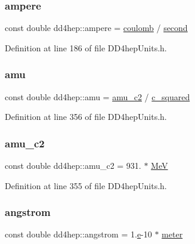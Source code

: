 \subsubsection{\texorpdfstring{ampere}{ampere}}
{\footnotesize\ttfamily const double dd4hep\+::ampere = \hyperlink{namespacedd4hep_a399f2340c615066766d822ce9c9781b7}{coulomb} / \hyperlink{namespacedd4hep_ac03364576705a245265d8ed6ea26b871}{second}\hspace{0.3cm}{\ttfamily [static]}}



Definition at line 186 of file D\+D4hep\+Units.\+h.

\hypertarget{namespacedd4hep_a0b45315a57cae4bbe7083252cd13f6e8}{}\label{namespacedd4hep_a0b45315a57cae4bbe7083252cd13f6e8} 
\subsubsection{\texorpdfstring{amu}{amu}}
{\footnotesize\ttfamily const double dd4hep\+::amu = \hyperlink{namespacedd4hep_a6bf5b89f5cde619efc44b8b11104932f}{amu\+\_\+c2} / \hyperlink{namespacedd4hep_a1501a5f994e55104b62b1907ff652300}{c\+\_\+squared}\hspace{0.3cm}{\ttfamily [static]}}



Definition at line 356 of file D\+D4hep\+Units.\+h.

\hypertarget{namespacedd4hep_a6bf5b89f5cde619efc44b8b11104932f}{}\label{namespacedd4hep_a6bf5b89f5cde619efc44b8b11104932f} 
\subsubsection{\texorpdfstring{amu\+\_\+c2}{amu\_c2}}
{\footnotesize\ttfamily const double dd4hep\+::amu\+\_\+c2 = 931. $\ast$ \hyperlink{namespacedd4hep_a6dee62809c6ee54d2fc90671f4dc8b91}{MeV}\hspace{0.3cm}{\ttfamily [static]}}



Definition at line 355 of file D\+D4hep\+Units.\+h.

\hypertarget{namespacedd4hep_a82387b0906ee031cb7ef93723f99c474}{}\label{namespacedd4hep_a82387b0906ee031cb7ef93723f99c474} 
\subsubsection{\texorpdfstring{angstrom}{angstrom}}
{\footnotesize\ttfamily const double dd4hep\+::angstrom = 1.\hyperlink{_volumes_8cpp_a8a9a1f93e9b09afccaec215310e64142}{e}-\/10 $\ast$ \hyperlink{namespacedd4hep_a46f5cf0231796af4296a307a58812b06}{meter}\hspace{0.3cm}{\ttfamily [static]}}



